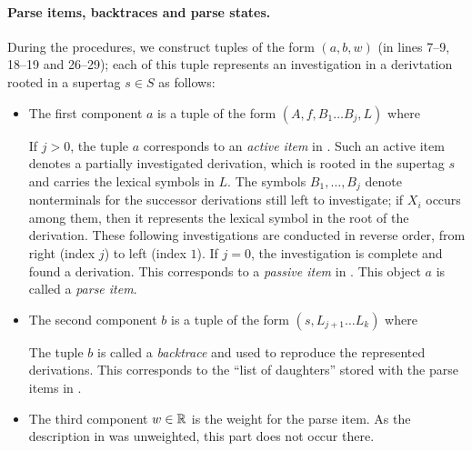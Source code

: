 \documentclass[../../document.tex]{subfiles}
\begin{document}
    \paragraph{Parse items, backtraces and parse states.} During the procedures, we construct tuples of the form \((a, b, w)\) (in lines 7--9, 18--19 and 26--29); each of this tuple represents an investigation in a derivtation rooted in a  supertag \(s \in S\) as follows:
    \begin{itemize}
        \item The first component \(a\) is a tuple of the form \((A, f, B_1 \ldots B_j, L)\) where
            If \(j>0\), the tuple \(a\) corresponds to an \emph{active item} in .
            Such an active item denotes a partially investigated derivation, which is rooted in the supertag \(s\) and carries the lexical symbols in \(L\).
            The symbols \(B_1, \ldots, B_j\) denote nonterminals for the successor derivations still left to investigate; if \(X_i\) occurs among them, then it represents the lexical symbol in the root of the derivation.
            These following investigations are conducted in reverse order, from right (index $j$) to left (index $1$).
            If \(j=0\), the investigation is complete and found a derivation. This corresponds to a \emph{passive item} in .
            This object \(a\) is called a \emph{parse item}.
        \item The second component \(b\) is a tuple of the form \((s, L_{j+1} \ldots L_k)\) where
            The tuple \(b\) is called a \emph{backtrace} and used to reproduce the represented derivations.
            This corresponds to the ``list of daughters'' stored with the parse items in .
        \item
            The third component \(w \in \mathbb{R}\) is the weight for the parse item.
            As the description in  was unweighted, this part does not occur there.
    \end{itemize}
\end{document}
